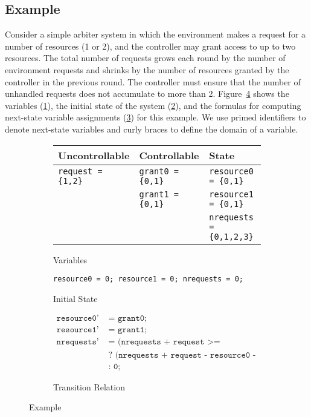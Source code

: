 \subsection{Example}

Consider a simple arbiter system in which the environment makes a request for a number of resources (1 or 2), and the controller may grant access to up to two resources.  The total number of requests grows each round by the number of environment requests and shrinks by the number of resources granted by the controller in the previous round.  The controller must ensure that the number of unhandled requests does not accumulate to more than 2.  Figure~\ref{fig:example} shows the variables (\ref{fig:examplevars}), the initial state of the system (\ref{fig:exampleinit}), and the formulas for computing next-state variable assignments (\ref{fig:exampletrans}) for this example. We use primed identifiers to denote next-state variables and curly braces to define the domain of a variable.


\begin{figure}
    \begin{subfigure}[t]{\textwidth}
        \centering
        \begin{tabular}{l | l | l}
            \textbf{Uncontrollable} & \textbf{Controllable} & \textbf{State} \\
            \hline
            \texttt{request = \{1,2\}} & \texttt{grant0 = \{0,1\}} & \texttt{resource0 = \{0,1\}} \\
            & \texttt{grant1 = \{0,1\}} & \texttt{resource1 = \{0,1\}} \\
            & & \texttt{nrequests = \{0,1,2,3\}} \\
        \end{tabular}
        \caption{Variables}
        \label{fig:examplevars}
    \end{subfigure}

    \vspace{5mm}
    \begin{subfigure}[t]{\textwidth}
        \centering
        \texttt{resource0 = 0; resource1 = 0; nrequests = 0;}
        \caption{Initial State}
        \label{fig:exampleinit}
    \end{subfigure}

    \begin{subfigure}[t]{\textwidth}
        \begin {align*}
            \texttt{resource0'} & \texttt{ = grant0;} \\
            \texttt{resource1'} & \texttt{ = grant1;} \\
            \texttt{nrequests'} & \texttt{ = (nrequests + request >= resource0 + resource1)} \\ 
                                & \texttt{ ? (nrequests + request - resource0 - resource1)}\\
                                & \texttt{ : 0;}
        \end{align*}
        \caption{Transition Relation}
        \label{fig:exampletrans}
    \end{subfigure}
    \caption{Example}
    \label{fig:example}
\end{figure}


